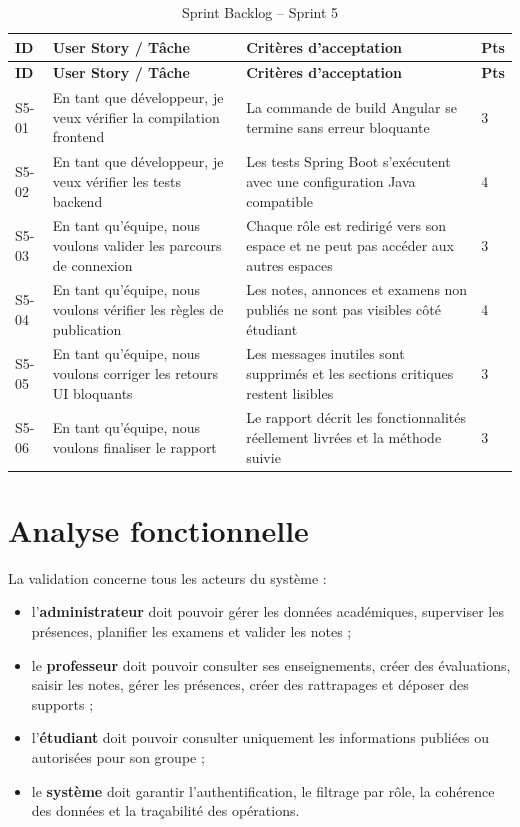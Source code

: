 \documentclass[12pt,a4paper]{report}
\begin{document}
\begin{longtable}{|p{1.6cm}|p{6cm}|p{5.6cm}|p{1.4cm}|}
\caption{Sprint Backlog -- Sprint 5}\\
\hline
\textbf{ID} & \textbf{User Story / Tâche} & \textbf{Critères d'acceptation} & \textbf{Pts} \\
\hline
\endfirsthead
\hline
\textbf{ID} & \textbf{User Story / Tâche} & \textbf{Critères d'acceptation} & \textbf{Pts} \\
\hline
\endhead
S5-01 & En tant que développeur, je veux vérifier la compilation frontend & La commande de build Angular se termine sans erreur bloquante & 3 \\
\hline
S5-02 & En tant que développeur, je veux vérifier les tests backend & Les tests Spring Boot s'exécutent avec une configuration Java compatible & 4 \\
\hline
S5-03 & En tant qu'équipe, nous voulons valider les parcours de connexion & Chaque rôle est redirigé vers son espace et ne peut pas accéder aux autres espaces & 3 \\
\hline
S5-04 & En tant qu'équipe, nous voulons vérifier les règles de publication & Les notes, annonces et examens non publiés ne sont pas visibles côté étudiant & 4 \\
\hline
S5-05 & En tant qu'équipe, nous voulons corriger les retours UI bloquants & Les messages inutiles sont supprimés et les sections critiques restent lisibles & 3 \\
\hline
S5-06 & En tant qu'équipe, nous voulons finaliser le rapport & Le rapport décrit les fonctionnalités réellement livrées et la méthode suivie & 3 \\
\hline
\end{longtable}

\section{Analyse fonctionnelle}

La validation concerne tous les acteurs du système :

\begin{itemize}[itemsep=0.4em]
    \item l'\textbf{administrateur} doit pouvoir gérer les données académiques, superviser les présences, planifier les examens et valider les notes ;
    \item le \textbf{professeur} doit pouvoir consulter ses enseignements, créer des évaluations, saisir les notes, gérer les présences, créer des rattrapages et déposer des supports ;
    \item l'\textbf{étudiant} doit pouvoir consulter uniquement les informations publiées ou autorisées pour son groupe ;
    \item le \textbf{système} doit garantir l'authentification, le filtrage par rôle, la cohérence des données et la traçabilité des opérations.
\end{itemize}
\end{document}
